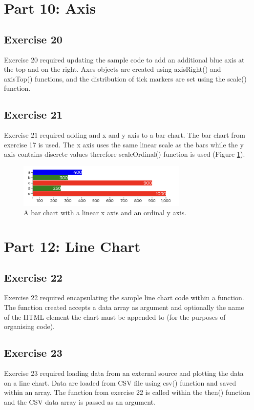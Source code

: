 \documentclass[11pt]{article}   	%
\begin{document}
\section{Part 10: Axis}
\subsection{Exercise 20 }
\vspace{-1em}
Exercise 20 required updating the sample code to add an additional blue axis at the top and on the right. Axes objects are created using axisRight() and axisTop() functions, and the distribution of tick markers are set using the scale() function.

\subsection{Exercise 21 }
\vspace{-1em}
Exercise 21 required adding and x and y axis to a bar chart. The bar chart from exercise 17 is used. The x axis uses the same linear scale as the bars while the y axis contains discrete values therefore scaleOrdinal() function is used (Figure \ref{fig:ex21}). 

\begin{figure}[H]
\centering
\includegraphics[width=0.75\textwidth]{data/ex21.png}
\caption{A bar chart with a linear x axis and an ordinal y axis.}
\label{fig:ex21}
\end{figure}

\section{Part 12: Line Chart }
\subsection{ Exercise 22 }
\vspace{-1em}
Exercise 22 required encapsulating the sample line chart code within a function. The function created accepts a data array as argument and optionally the name of the HTML element the chart must be appended to (for the purposes of organising code). 

\subsection{Exercise 23 }
\vspace{-1em}
Exercise 23 required loading data from an external source and plotting the data on a line chart. Data are loaded from CSV file using csv() function and saved within an array. The function from exercise 22 is called within the then() function and the CSV data array is passed as an argument. 
\end{document}
